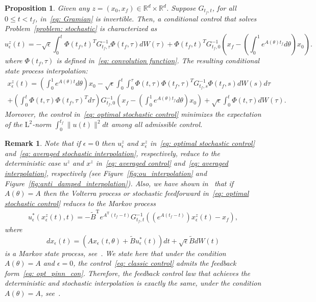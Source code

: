 \documentclass[12pt]{amsart}
\newtheorem{proposition}{Proposition}[section]
\newtheorem{remark}{Remark}[section]
\newcommand{\R}{\mathbb{R}}
\renewcommand{\(}{\left (}
\renewcommand{\)}{\right )}
\numberwithin{equation}{section}
\begin{document}
\begin{proposition}
Given any $z=(x_0,x_f)\in\R^d\times\R^d$. Suppose $G_{t_f,t}$, for all $0\leq t<t_f$, in~\eqref{eq: Gramian} is invertible. Then, a conditional control that solves Problem~\ref{problem: stochastic} is characterized as 
\begin{equation}\label{eq: optimal stochastic control}
  u_{\epsilon}^z(t)= -\sqrt{\epsilon}\int_0^t\Phi(t_f,t)^T G_{t_f,\tau}^{-1}\Phi(t_f,\tau) dW(\tau)+\Phi(t_f,t)^{T}G_{t_f,0}^{-1}\left(x_f-\left(\int_{0}^{1}e^{A(\theta)t_f}d\theta\right) x_0\right).    
 \end{equation} 
 where $\Phi(t_f,\tau)$ is defined in~\eqref{eq: convolution function}.
The resulting conditional state process interpolation:
\begin{multline}\label{eq: averaged stochastic interpolation}
 x_{\epsilon}^z(t)=\left(\int_0^1e^{A(\theta)t}d\theta\right) x_0-\sqrt{\epsilon}\int_0^t\int_0^{\tau}\Phi(t,\tau)\Phi(t_f,\tau)^T G_{t_f,s}^{-1}\Phi(t_f,s) dW(s)d\tau\\+\left(\int_0^t\Phi(t,\tau)\Phi(t_f,\tau)^{T}d\tau\right) G_{t_f,0}^{-1}\left(x_f-\left(\int_{0}^{1}e^{A(\theta)t_f}d\theta\right) x_0\right) +\sqrt{\epsilon}\int_0^t \Phi(t,\tau) dW(\tau).
\end{multline}
Moreover, the control in~\eqref{eq: optimal stochastic control} minimizes the expectation of the $\mathrm{L}^2$-norm $\int_0^{t_f}\|u(t)\|^2dt$ among all admissible control.
\end{proposition}
\begin{remark}
    Note that if $\epsilon=0$ then $u_{\epsilon}^z$ and $x_{\epsilon}^z$ in~\eqref{eq: optimal stochastic control} and~\eqref{eq: averaged stochastic interpolation}, respectively, reduce to the deterministic case $u^z$ and $x^z$ in~\eqref{eq: averaged control} and~\eqref{eq: averaged interpolation}, respectively (see Figure~\ref{fig:ou_interpolation} and Figure~\ref{fig:anti_damped_interpolation}). Also, we have shown in~\cite{DOA-YC:23,DOA-YC:24} that if $A(\theta)=A$ then the Volterra process or stochastic feedforward in~\eqref{eq: optimal stochastic control} reduces to the Markov process
\begin{align}\label{eq: opt_pinn_con}
u^*_{\epsilon}(x^z_{\epsilon}(t),t)=-\tilde{B}^{\mathrm{T}}e^{A^{\mathrm{T}}(t_f-t)}G_{t_f,t}^{-1}\left(\left(e^{A(t_f-t)}\right)x^z_{\epsilon}(t)-x_f\right),
\end{align}
where 
\begin{equation}\label{eq: Markov_state_process}
d x_{\epsilon}(t)=(Ax_{\epsilon}(t,\theta)+\tilde{B}u^*_{\epsilon}(t))d t+\sqrt{\epsilon}\tilde{B}d W(t) 
\end{equation}
is a Markov state process, see~\cite{CY-GT:15}. We state here that under the condition $A(\theta)=A$ and $\epsilon=0$, the control~\eqref{eq: classic control} admits the feedback form~\eqref{eq: opt_pinn_con}. Therefore, the feedback control law that achieves the deterministic and stochastic interpolation is exactly the same, under the condition $A(\theta)=A$, see~\cite{YM-MA-AT-YC:24}. 
\end{remark}
\end{document}

